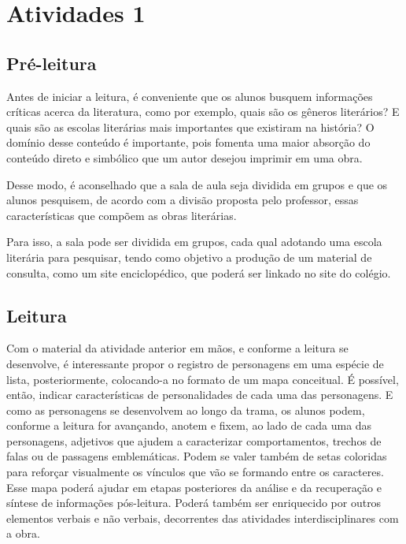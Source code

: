 \documentclass[12pt]{extarticle}
\begin{document}
\tableofcontents




\section{Atividades 1}


\subsection{Pré-leitura}


Antes de iniciar a leitura, é conveniente que os alunos
busquem informações críticas acerca da literatura, como por exemplo,
quais são os gêneros literários? E quais são as escolas literárias mais
importantes que existiram na história? O domínio desse conteúdo é
importante, pois fomenta uma maior absorção do conteúdo direto e
simbólico que um autor desejou imprimir em uma obra.

Desse modo, é aconselhado que a sala de aula seja dividida em grupos e
que os alunos pesquisem, de acordo com a divisão proposta pelo
professor, essas características que compõem as obras literárias.

Para isso, a sala pode ser dividida em grupos, cada qual adotando uma
escola literária para pesquisar, tendo como objetivo a produção de um
material de consulta, como um site enciclopédico, que poderá ser linkado
no site do colégio.

\subsection{Leitura}


Com o material da atividade anterior em mãos, e conforme a
leitura se desenvolve, é interessante propor o registro de personagens
em uma espécie de lista, posteriormente, colocando-a no formato de um
mapa conceitual. É possível, então, indicar características de
personalidades de cada uma das personagens. E como as personagens se
desenvolvem ao longo da trama, os alunos podem, conforme a leitura for
avançando, anotem e fixem, ao lado de cada uma das personagens,
adjetivos que ajudem a caracterizar comportamentos, trechos de falas ou
de passagens emblemáticas. Podem se valer também de setas coloridas para
reforçar visualmente os vínculos que vão se formando entre os
caracteres. Esse mapa poderá ajudar em etapas posteriores da análise e
da recuperação e síntese de informações pós-leitura. Poderá também ser
enriquecido por outros elementos verbais e não verbais, decorrentes das
atividades interdisciplinares com a obra.
\end{document}
